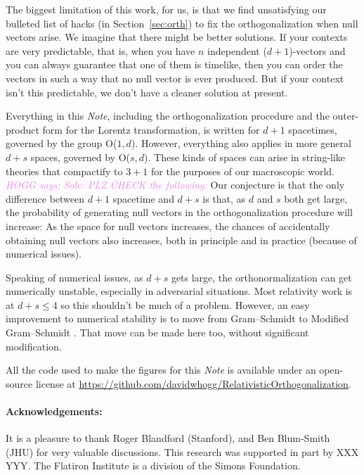 \documentclass{article}
\newcommand{\plus}{\!+\!} %
\newcommand{\documentname}{\textsl{Note}}
\newcommand{\secref}[1]{Section~\ref{#1}}
\newcommand{\HOGG}[1]{\textcolor{violet}{\textsl{HOGG says: {#1}}}}
\begin{document}
The biggest limitation of this work, for us, is that we find unsatisfying our bulleted list of hacks (in \secref{sec:orth}) to fix the orthogonalization when null vectors arise.
We imagine that there might be better solutions.
If your contexts are very predictable, that is, when you have $n$ independent ($d\plus1$)-vectors and you can always guarantee that one of them is timelike, then you can order the vectors in such a way that no null vector is ever produced.
But if your context isn't this predictable, we don't have a cleaner solution at present.

Everything in this \documentname{}, including the orthogonalization procedure and the outer-product form for the Lorentz transformation, is written for $d\plus1$ spacetimes, governed by the group O($1,d$).
However, everything also applies in more general $d\plus s$ spaces, governed by O($s,d$).
These kinds of spaces can arise in string-like theories that compactify to $3\plus 1$ for the purposes of our macroscopic world.
\HOGG{Sole: PLZ CHECK the following:}
Our conjecture is that the only difference between $d\plus1$ spacetime and $d\plus s$ is that, as $d$ and $s$ both get large, the probability of generating null vectors in the orthogonalization procedure will increase:
As the space for null vectors increases, the chances of accidentally obtaining null vectors also increases, both in principle and in practice (because of numerical issues).

Speaking of numerical issues, as $d+s$ gets large, the orthonormalization can get numerically unstable, especially in adversarial situations.
Most relativity work is at $d+s\leq 4$ so this shouldn't be much of a problem.
However, an easy improvement to numerical stability is to move from Gram--Schmidt to Modified Gram--Schmidt \cite{modifiedgramschmidt}.
That move can be made here too, without significant modification.

All the code used to make the figures for this \documentname{} is available under an open-source license at \url{https://github.com/davidwhogg/RelativisticOrthogonalization}.

\paragraph{Acknowledgements:}
It is a pleasure to thank
  Roger Blandford (Stanford), and
  Ben Blum-Smith (JHU)
for very valuable discussions.
This research was supported in part by XXX YYY.
The Flatiron Institute is a division of the Simons Foundation.

\raggedright


\end{document}

